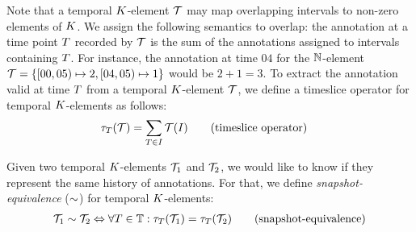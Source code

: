 Note that a temporal $K$-element $\mathcal{T}$ may map overlapping
intervals to non-zero elements of $K$.
We assign the following semantics to overlap: the
annotation at a time point $T$ recorded by $\mathcal{T}$ is the
sum of the annotations assigned to intervals containing $T$.
For instance, the annotation at time $04$ for the  ${\mathbb{N}}$-element $\mathcal{T} = \{ [00, 05) \mapsto 2, [04, 05) \mapsto 1 \}$ would be $2 + 1 = 3$.
To extract the annotation
valid at time $T$ from a temporal $K$-element $\mathcal{T}$, we
define a timeslice operator for temporal $K$-elements as follows:
%
\begin{align*}\label{eq:temp-k-elem-timeslice}
  &\tSlice{\tPoint}(\anyTE) = \sum_{%
\tPoint \in \interval} \anyTE(\interval) \tag{timeslice operator}
\end{align*}

Given two temporal $K$-elements $\mathcal{T}_1$ and $\mathcal{T}_2$, we
would like to know if they represent the same history of annotations.
For that, we define \emph{snapshot-equivalence} ($\sim$) for
temporal $K$-elements:
\begin{align*}\label{eq:temp-k-element-equivalence}
\mathcal{T}_1 \sim \mathcal{T}_2 \Leftrightarrow \forall T \in \mathbb{T}: \tau_{T}(\mathcal{T}_1) = \tau_{T}(\mathcal{T}_2) \tag{snapshot-equivalence}
\end{align*}





